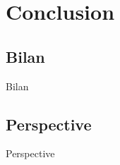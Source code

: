 \documentclass[10pt,handout]{beamer}
\begin{document}
\section{Conclusion}

\subsection{Bilan}

\begin{frame}{Bilan}

\end{frame}

\subsection{Perspective}

\begin{frame}{Perspective}

\end{frame}
\end{document}
